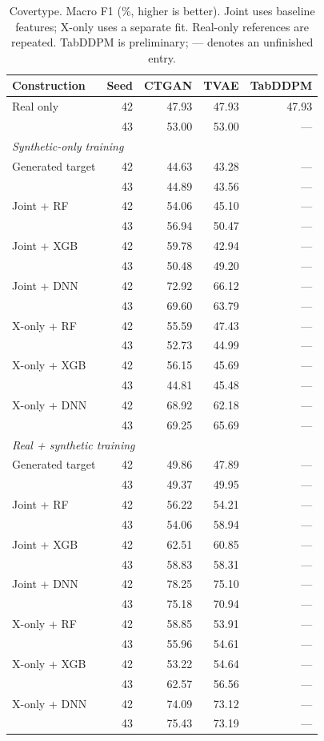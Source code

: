 \begin{table}[ht]
\centering
{\small
\setlength{\tabcolsep}{2pt}
\begin{tabular}{lrrrr}
\toprule
Construction & Seed & CTGAN & TVAE & TabDDPM \\
\midrule
Real only & 42 & 47.93 & 47.93 & 47.93 \\
 & 43 & 53.00 & 53.00 & --- \\
\midrule
\multicolumn{5}{l}{\textit{Synthetic-only training}} \\
Generated target & 42 & 44.63 & 43.28 & --- \\
 & 43 & 44.89 & 43.56 & --- \\
Joint + RF & 42 & 54.06 & 45.10 & --- \\
 & 43 & 56.94 & 50.47 & --- \\
Joint + XGB & 42 & 59.78 & 42.94 & --- \\
 & 43 & 50.48 & 49.20 & --- \\
Joint + DNN & 42 & 72.92 & 66.12 & --- \\
 & 43 & 69.60 & 63.79 & --- \\
X-only + RF & 42 & 55.59 & 47.43 & --- \\
 & 43 & 52.73 & 44.99 & --- \\
X-only + XGB & 42 & 56.15 & 45.69 & --- \\
 & 43 & 44.81 & 45.48 & --- \\
X-only + DNN & 42 & 68.92 & 62.18 & --- \\
 & 43 & 69.25 & 65.69 & --- \\
\midrule
\multicolumn{5}{l}{\textit{Real + synthetic training}} \\
Generated target & 42 & 49.86 & 47.89 & --- \\
 & 43 & 49.37 & 49.95 & --- \\
Joint + RF & 42 & 56.22 & 54.21 & --- \\
 & 43 & 54.06 & 58.94 & --- \\
Joint + XGB & 42 & 62.51 & 60.85 & --- \\
 & 43 & 58.83 & 58.31 & --- \\
Joint + DNN & 42 & 78.25 & 75.10 & --- \\
 & 43 & 75.18 & 70.94 & --- \\
X-only + RF & 42 & 58.85 & 53.91 & --- \\
 & 43 & 55.96 & 54.61 & --- \\
X-only + XGB & 42 & 53.22 & 54.64 & --- \\
 & 43 & 62.57 & 56.56 & --- \\
X-only + DNN & 42 & 74.09 & 73.12 & --- \\
 & 43 & 75.43 & 73.19 & --- \\
\bottomrule
\end{tabular}
}
\caption{Covertype. Macro F1 (\%, higher is better). Joint uses baseline features; X-only uses a separate fit. Real-only references are repeated. TabDDPM is preliminary; --- denotes an unfinished entry.}
\label{tab:covertype}
\end{table}
